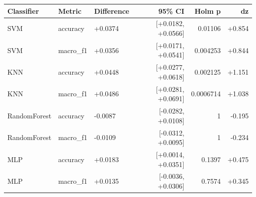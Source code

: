 \begin{tabular}{lllrrr}
\toprule
Classifier & Metric & Difference & 95\% CI & Holm p & dz \\
\midrule
SVM & accuracy & +0.0374 & [+0.0182, +0.0566] & 0.01106 & +0.854 \\
SVM & macro\_f1 & +0.0356 & [+0.0171, +0.0541] & 0.004253 & +0.844 \\
KNN & accuracy & +0.0448 & [+0.0277, +0.0618] & 0.002125 & +1.151 \\
KNN & macro\_f1 & +0.0486 & [+0.0281, +0.0691] & 0.0006714 & +1.038 \\
RandomForest & accuracy & -0.0087 & [-0.0282, +0.0108] & 1 & -0.195 \\
RandomForest & macro\_f1 & -0.0109 & [-0.0312, +0.0095] & 1 & -0.234 \\
MLP & accuracy & +0.0183 & [+0.0014, +0.0351] & 0.1397 & +0.475 \\
MLP & macro\_f1 & +0.0135 & [-0.0036, +0.0306] & 0.7574 & +0.345 \\
\bottomrule
\end{tabular}
